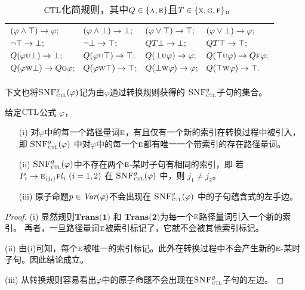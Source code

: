 \begin{table}[h!]%
	\centering\caption{$\textrm{CTL}$化简规则，其中$Q\in \{\textsc{a}, \textsc{e}\}$且$T\in \{\textsc{x},\textsc{g},\textsc{f}\}$。}\label{tab:simp}
	\begin{tabular}{c}
		\toprule
		$
		\begin{aligned}
			& (\varphi \wedge \top) \rightarrow \varphi;
			&&	(\varphi \wedge \bot) \rightarrow \bot;
			&&  (\varphi \vee \top) \rightarrow \top;
			&& (\varphi \vee \bot) \rightarrow \varphi; \\
			&  \neg \top \rightarrow \bot; 
			&& \neg \bot \rightarrow \top; 
			&&  QT \bot \rightarrow \bot; 
			&& QT \top \rightarrow \top;  \\
			& Q(\varphi \textsc{u} \bot) \rightarrow \bot;
			&& Q(\varphi \textsc{u} \top) \rightarrow \top;
			&& Q(\bot \textsc{u} \varphi) \rightarrow \varphi;
			&& Q(\top \textsc{u} \varphi) \rightarrow Q\textsc{f} \varphi;\\
			& Q(\varphi \textsc{w} \bot) \rightarrow Q\textsc{g} \varphi;
			&& Q(\varphi \textsc{w} \top) \rightarrow \top; 
			&& Q(\bot \textsc{w} \varphi) \rightarrow \varphi;
			&& Q(\top \textsc{w} \varphi) \rightarrow \top.
		\end{aligned}
		$\\
		\bottomrule
	\end{tabular}
\end{table}

下文也将${\textsc{SNF}_{\textsc{ctl}}^g}(\varphi)$记为由$\varphi$通过转换规则获得的 ${\textsc{SNF}_{\textsc{ctl}}^g}$子句的集合。


\begin{lemma} \label{lem:ResTransPt}
	给定$\textrm{CTL}$公式 $\varphi$，
	\begin{itemize}
		\item[(i)] 对$\varphi$中的每一个路径量词$\textsc{e}$，有且仅有一个新的索引在转换过程中被引入，即 ${\textsc{SNF}_{\textsc{ctl}}^g}(\varphi)$ 中对$\varphi$中的每一个$\textsc{e}$都有唯一一个带索引的存在路径量词。
		\item[(ii)] ${\textsc{SNF}_{\textsc{ctl}}^g}(\varphi)$中不存在两个$\textsc{e}$-某时子句有相同的索引，即
		若 $P_i\rightarrow \textsc{e}_{{\langle{j_i}\rangle}}\textsc{f} l_i~(i=1,2)$ 在 ${\textsc{SNF}_{\textsc{ctl}}^g}(\varphi)$ 中，则
		$j_1\neq j_2$。
		\item[(iii)] 原子命题$p \in\textit{Var}(\varphi)$不会出现在 ${\textsc{SNF}_{\textsc{ctl}}^g}(\varphi)$ 中的子句蕴含式的左手边。
	\end{itemize}
\end{lemma}
\begin{proof}
	(i) 显然规则$\textbf{Trans(1)}$ 和 $\textbf{Trans(2)}$为每一个$\textsc{e}$路径量词引入一个新的索引。 
	再者，一旦路径量词$\textsc{e}$被索引标记了，它就不会被其他索引标记。
	
	(ii) 由(i)可知，每个$\textsc{e}$被唯一的索引标记。此外在转换过程中不会产生新的$\textsc{e}$-某时子句。因此结论成立。
	
	(iii) 从转换规则容易看出$\varphi$中的原子命题不会出现在${\textsc{SNF}_{\textsc{ctl}}^g}$子句的左边。
\end{proof}

